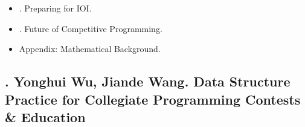 \documentclass{article}
\begin{document}
\begin{itemize}
\begin{itemize}
\begin{itemize}
\begin{verbatim}
				    count++;
				    for (int j = 2*i; j <= n; j += i) {
				        sieve[j] = 1;
				    }
				}
				cout << count << "\n";
			\end{verbatim}
			{\sf Table 16.1: Results of prime counting experiment} shows results of experiment. It can be seen: PyPy \& C++ are much faster than CPython in large tests. However, difference between PyPy \& C++ is quite small.
			\item {.2. Counting Permutations.}
		\end{itemize}
	\end{itemize}
	\item {. Preparing for IOI.}
	\item {. Future of Competitive Programming.}
	\item {\sf Appendix: Mathematical Background.}
\end{itemize}


\subsection{\cite{Wu_Wang2016}. {\sc Yonghui Wu, Jiande Wang}. Data Structure Practice for Collegiate Programming Contests \& Education}
\end{document}
